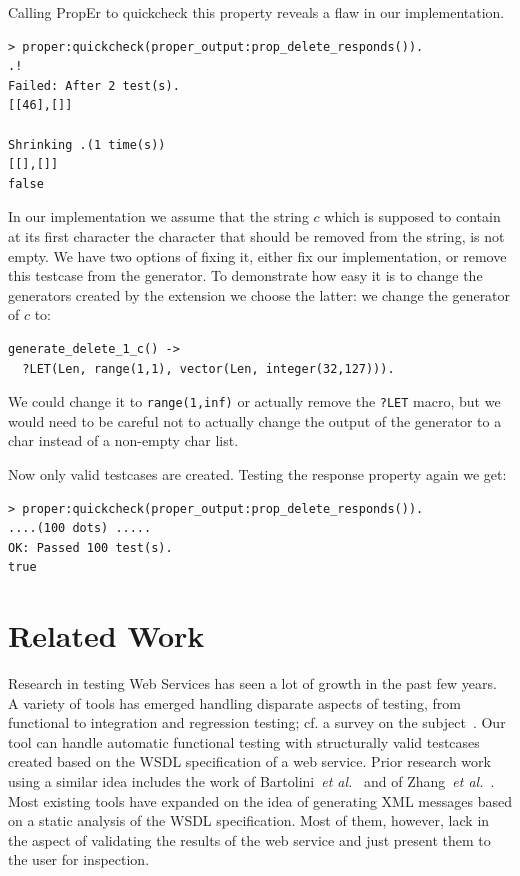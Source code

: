 \documentclass[submission,copyright,a4]{eptcs}
\newcommand{\LET}{\texttt{?LET}\xspace}
\begin{document}
Calling PropEr to quickcheck this property reveals a flaw in our implementation.
\begin{lstlisting}
> proper:quickcheck(proper_output:prop_delete_responds()). 
.!
Failed: After 2 test(s).
[[46],[]]

Shrinking .(1 time(s))
[[],[]]
false
\end{lstlisting}

In our implementation we assume that the string $c$ which is supposed
to contain at its first character the character that should be removed
from the string, is not empty. We have two options of fixing it, either
fix our implementation, or remove this testcase from the generator. To
demonstrate how easy it is to change the generators created by the extension
we choose the latter: we change the generator of $c$ to:
\begin{lstlisting}
generate_delete_1_c() ->
  ?LET(Len, range(1,1), vector(Len, integer(32,127))).
\end{lstlisting}

We could change it to \texttt{range(1,inf)} or actually remove the
\LET macro, but we would need to be careful not to actually change the
output of the generator to a char instead of a non-empty char list.

Now only valid testcases are created. Testing the response property again we 
get:
\begin{lstlisting}
> proper:quickcheck(proper_output:prop_delete_responds()).
....(100 dots) .....
OK: Passed 100 test(s).
true
\end{lstlisting}

\section{Related Work} \label{sec:related}

Research in testing Web Services has seen a lot of growth in the past
few years. A variety of tools has emerged handling disparate aspects
of testing, from functional to integration and regression testing; cf.
a survey on the subject~\cite{SOATesting@springerlink-09}. Our tool
can handle automatic functional testing with structurally valid
testcases created based on the WSDL specification of a web service.
Prior research work using a similar idea includes the work of
Bartolini~\textit{et al.}~\cite{bartolini@ICSOC-08} and of
Zhang~\textit{et al.}~\cite{zhang@IC-08}. Most existing tools have
expanded on the idea of generating XML messages based on a static
analysis of the WSDL specification. Most of them, however, lack in the
aspect of validating the results of the web service and just present
them to the user for inspection.
\end{document}
